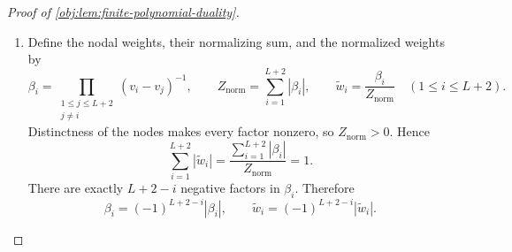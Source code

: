 \begin{proof}[Proof of \cref{obj:lem:finite-polynomial-duality}]
\begin{enumerate}
\[\begin{aligned}
+t_{\mathrm{imp}}^2Q_{\mathrm{sgn}}(v)^2\\
&<\rho(v)^2
\le\mathcal E_{\mathrm{app}}^2.
\end{aligned}
\]
For \(v\in[v_-,v_+]\setminus\mathcal H_{\mathrm{imp}}\),
\[
\begin{aligned}
|\rho(v)-t_{\mathrm{imp}}Q_{\mathrm{sgn}}(v)|
&\le|\rho(v)|+t_{\mathrm{imp}}|Q_{\mathrm{sgn}}(v)|\\
&<c_{\mathrm{imp}}
+\frac{\mathcal E_{\mathrm{app}}-c_{\mathrm{imp}}}{2}
<\mathcal E_{\mathrm{app}}.
\end{aligned}
\]
The perturbed residual is continuous on the compact interval, so these pointwise strict inequalities imply
\[
\|\rho-t_{\mathrm{imp}}Q_{\mathrm{sgn}}\|_\infty
<\mathcal E_{\mathrm{app}}.
\]
But the polynomial
\[
Q_{\mathrm{imp}}=Q_*+t_{\mathrm{imp}}Q_{\mathrm{sgn}}
\]
has degree at most \(L\), and hence
\[
\mathcal E_{\mathrm{app}}
\le\|g-Q_{\mathrm{imp}}\|_\infty
=\|\rho-t_{\mathrm{imp}}Q_{\mathrm{sgn}}\|_\infty
<\mathcal E_{\mathrm{app}},
\]
a contradiction.

Thus, when \(\mathcal E_{\mathrm{app}}>0\), there exist increasing interval nodes \(v_1,\ldots,v_{L+2}\) with alternating residual values. Define their orientation by
\[
\eta=\frac{\rho(v_1)}{\mathcal E_{\mathrm{app}}}\in\{-1,1\}.
\]
Together with the zero-error construction, we have in both cases
\[
v_-\le v_1<\cdots<v_{L+2}\le v_+,
\qquad
\eta\in\{-1,1\},
\qquad
\rho(v_i)=\eta(-1)^{i-1}\mathcal E_{\mathrm{app}}.
\]

\item Define the nodal weights, their normalizing sum, and the normalized weights by
\[
\beta_i
=
\prod_{\substack{1\le j\le L+2\\j\ne i}}(v_i-v_j)^{-1},
\qquad
Z_{\mathrm{norm}}=\sum_{i=1}^{L+2}|\beta_i|,
\qquad
\widetilde w_i=\frac{\beta_i}{Z_{\mathrm{norm}}}
\quad(1\le i\le L+2).
\]
Distinctness of the nodes makes every factor nonzero, so \(Z_{\mathrm{norm}}>0\). Hence
\[
\sum_{i=1}^{L+2}|\widetilde w_i|
=
\frac{\sum_{i=1}^{L+2}|\beta_i|}{Z_{\mathrm{norm}}}
=1.
\]
There are exactly \(L+2-i\) negative factors in \(\beta_i\). Therefore
\[
\beta_i=(-1)^{L+2-i}|\beta_i|,
\qquad
\widetilde w_i=(-1)^{L+2-i}|\widetilde w_i|.
\]


\end{enumerate}
\end{proof}
